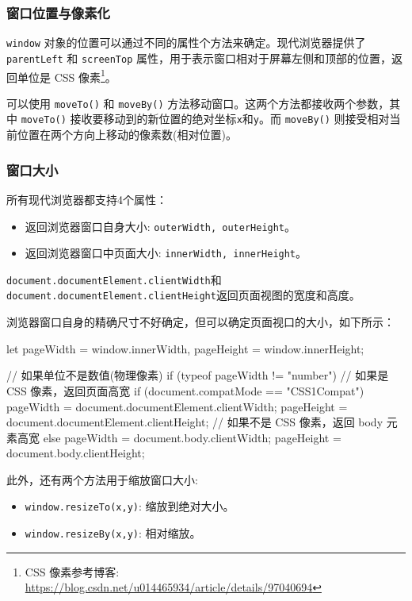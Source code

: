 \subsubsection*{窗口位置与像素化}

\texttt{window} 对象的位置可以通过不同的属性个方法来确定。现代浏览器提供了 \texttt{parentLeft} 和 \texttt{screenTop} 属性，用于表示窗口相对于屏幕左侧和顶部的位置，返回单位是 CSS 像素\footnote{CSS 像素参考博客: \url{https://blog.csdn.net/u014465934/article/details/97040694}}。

可以使用 \texttt{moveTo()} 和 \texttt{moveBy()} 方法移动窗口。这两个方法都接收两个参数，其中 \texttt{moveTo()} 接收要移动到的新位置的绝对坐标\texttt{x}和\texttt{y}。而 \texttt{moveBy()} 则接受相对当前位置在两个方向上移动的像素数(相对位置)。

\subsubsection*{窗口大小}

所有现代浏览器都支持4个属性：
\begin{itemize}
    \item 返回浏览器窗口自身大小: \texttt{outerWidth, outerHeight}。
    \item 返回浏览器窗口中页面大小: \texttt{innerWidth, innerHeight}。
\end{itemize}

\texttt{document.documentElement.clientWidth}和\texttt{document.documentElement.clientHeight}返回页面视图的宽度和高度。

浏览器窗口自身的精确尺寸不好确定，但可以确定页面视口的大小，如下所示：

\begin{JavaScript}
let pageWidth = window.innerWidth,
    pageHeight = window.innerHeight;

// 如果单位不是数值(物理像素)
if (typeof pageWidth != "number") {
    // 如果是 CSS 像素，返回页面高宽
    if (document.compatMode == "CSS1Compat") {
        pageWidth = document.documentElement.clientWidth;
        pageHeight = document.documentElement.clientHeight;
    // 如果不是 CSS 像素，返回 body 元素高宽
    } else {
        pageWidth = document.body.clientWidth;
        pageHeight = document.body.clientHeight;
    }
}
\end{JavaScript}

此外，还有两个方法用于缩放窗口大小:
\begin{itemize}
    \item \texttt{window.resizeTo(x,y)}: 缩放到绝对大小。
    \item \texttt{window.resizeBy(x,y)}: 相对缩放。
\end{itemize}

